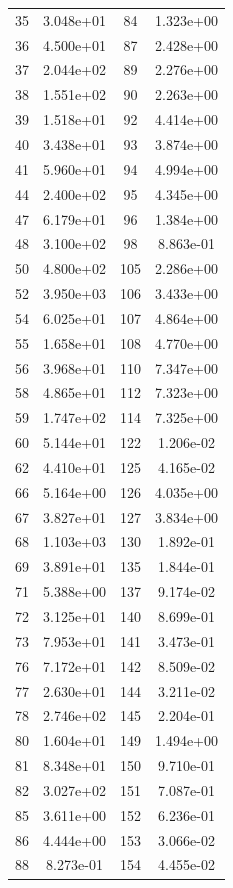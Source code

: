 \documentclass[12pt]{article}
\begin{document}
\begin{longtable}{@{}cccc@{}}
35 & 3.048e+01 & 84 & 1.323e+00 \\
36 & 4.500e+01 & 87 & 2.428e+00 \\
37 & 2.044e+02 & 89 & 2.276e+00 \\
38 & 1.551e+02 & 90 & 2.263e+00 \\
39 & 1.518e+01 & 92 & 4.414e+00 \\
40 & 3.438e+01 & 93 & 3.874e+00 \\
41 & 5.960e+01 & 94 & 4.994e+00 \\
44 & 2.400e+02 & 95 & 4.345e+00 \\
47 & 6.179e+01 & 96 & 1.384e+00 \\
48 & 3.100e+02 & 98 & 8.863e-01 \\
50 & 4.800e+02 & 105 & 2.286e+00 \\
52 & 3.950e+03 & 106 & 3.433e+00 \\
54 & 6.025e+01 & 107 & 4.864e+00 \\
55 & 1.658e+01 & 108 & 4.770e+00 \\
56 & 3.968e+01 & 110 & 7.347e+00 \\
58 & 4.865e+01 & 112 & 7.323e+00 \\
59 & 1.747e+02 & 114 & 7.325e+00 \\
60 & 5.144e+01 & 122 & 1.206e-02 \\
62 & 4.410e+01 & 125 & 4.165e-02 \\
66 & 5.164e+00 & 126 & 4.035e+00 \\
67 & 3.827e+01 & 127 & 3.834e+00 \\
68 & 1.103e+03 & 130 & 1.892e-01 \\
69 & 3.891e+01 & 135 & 1.844e-01 \\
71 & 5.388e+00 & 137 & 9.174e-02 \\
72 & 3.125e+01 & 140 & 8.699e-01 \\
73 & 7.953e+01 & 141 & 3.473e-01 \\
76 & 7.172e+01 & 142 & 8.509e-02 \\
77 & 2.630e+01 & 144 & 3.211e-02 \\
78 & 2.746e+02 & 145 & 2.204e-01 \\
80 & 1.604e+01 & 149 & 1.494e+00 \\
81 & 8.348e+01 & 150 & 9.710e-01 \\
82 & 3.027e+02 & 151 & 7.087e-01 \\
85 & 3.611e+00 & 152 & 6.236e-01 \\
86 & 4.444e+00 & 153 & 3.066e-02 \\
88 & 8.273e-01 & 154 & 4.455e-02 \\

\end{longtable}
\end{document}
